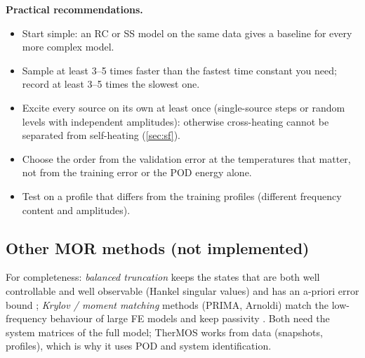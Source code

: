 \documentclass[11pt,a4paper]{article}
\begin{document}
\textbf{Practical recommendations.}
\begin{itemize}
  \item Start simple: an RC or SS model on the same data gives a baseline for every more complex model.
  \item Sample at least 3--5 times faster than the fastest time constant you need; record at least 3--5 times the
        slowest one.
  \item Excite every source on its own at least once (single-source steps or random levels with independent
        amplitudes): otherwise cross-heating cannot be separated from self-heating (\cref{sec:sf}).
  \item Choose the order from the validation error at the temperatures that matter, not from the training error or the
        POD energy alone.
  \item Test on a profile that differs from the training profiles (different frequency content and amplitudes).
\end{itemize}

\subsection*{Other MOR methods (not implemented)}
For completeness: \emph{balanced truncation} keeps the states that are both well controllable and well observable
(Hankel singular values) and has an a-priori error bound \cite{antoulas}; \emph{Krylov / moment matching} methods
(PRIMA, Arnoldi) match the low-frequency behaviour of large FE models and keep passivity \cite{antoulas}. Both need the
system matrices of the full model; TherMOS works from data (snapshots, profiles), which is why it uses POD and system
identification.

\end{document}

